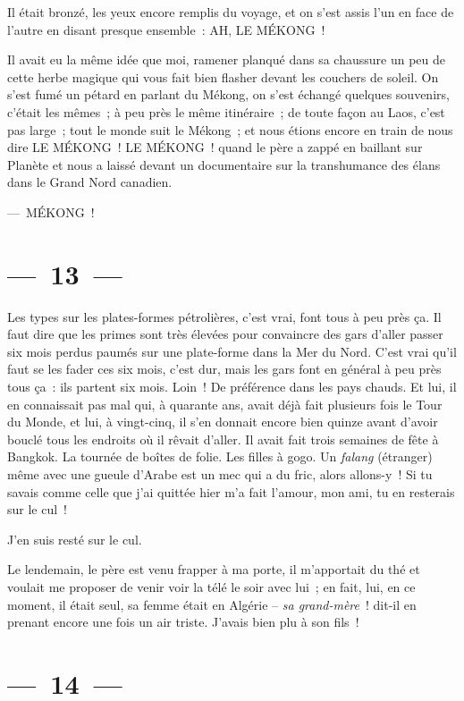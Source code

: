 \documentclass[french,twoside]{book} %
\begin{document}
Il était bronzé, les yeux encore remplis du voyage, et on s’est assis l’un en face de l’autre en disant presque ensemble : AH, LE MÉKONG !\par
Il avait eu la même idée que moi, ramener planqué dans sa chaussure un peu de cette herbe magique qui vous fait bien flasher devant les couchers de soleil. On s’est fumé un pétard en parlant du Mékong, on s’est échangé quelques souvenirs, c’était les mêmes ; à peu près le même itinéraire ; de toute façon au Laos, c’est pas large ; tout le monde suit le Mékong ; et nous étions encore en train de nous dire LE MÉKONG ! LE MÉKONG ! quand le père a zappé en baillant sur Planète et nous a laissé devant un documentaire sur la transhumance des élans dans le Grand Nord canadien.\par
— MÉKONG !

\section[{— 13 —}]{— 13 —}
\renewcommand{\leftmark}{— 13 —}

\noindent Les types sur les plates-formes pétrolières, c’est vrai, font tous à peu près ça. Il faut dire que les primes sont très élevées pour convaincre des gars d’aller passer six mois perdus paumés sur une plate-forme dans la Mer du Nord. C’est vrai qu’il faut se les fader ces six mois, c’est dur, mais les gars font en général à peu près tous ça : ils partent six mois. Loin ! De préférence dans les pays chauds. Et lui, il en connaissait pas mal qui, à quarante ans, avait déjà fait plusieurs fois le Tour du Monde, et lui, à vingt-cinq, il s’en donnait encore bien quinze avant d’avoir bouclé tous les endroits où il rêvait d’aller. Il avait fait trois semaines de fête à Bangkok. La tournée de boîtes de folie. Les filles à gogo. Un \emph{falang} (étranger) même avec une gueule d’Arabe est un mec qui a du fric, alors allons-y ! Si tu savais comme celle que j’ai quittée hier m’a fait l’amour, mon ami, tu en resterais sur le cul !\par
J’en suis resté sur le cul.\par
Le lendemain, le père est venu frapper à ma porte, il m’apportait du thé et voulait me proposer de venir voir la télé le soir avec lui ; en fait, lui, en ce moment, il était seul, sa femme était en Algérie – \emph{sa grand-mère} ! dit-il en prenant encore une fois un air triste. J’avais bien plu à son fils !

\section[{— 14 —}]{— 14 —}
\renewcommand{\leftmark}{— 14 —}
\end{document}
